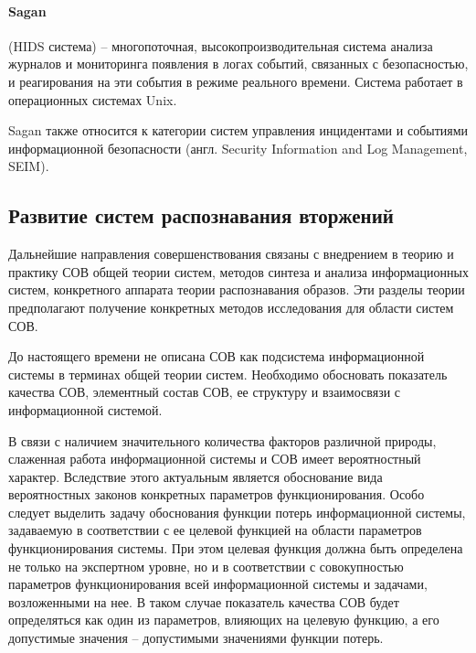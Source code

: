\paragraph*{Sagan} (HIDS система) -- многопоточная, высокопроизводительная система анализа журналов и мониторинга 
появления в логах событий, связанных с безопасностью, и реагирования на эти события в режиме реального времени. 
Система работает в операционных системах Unix. 

Sagan также относится к категории систем управления инцидентами и событиями информационной безопасности 
(англ. Security Information and Log Management, SEIM).


\subsection{Развитие систем распознавания вторжений}


Дальнейшие направления совершенствования связаны с внедрением в теорию и практику СОВ общей теории систем, методов синтеза и анализа информационных систем, конкретного аппарата теории распознавания образов. Эти разделы теории предполагают получение конкретных методов исследования для области систем СОВ.

До настоящего времени не описана СОВ как подсистема информационной системы в терминах общей теории систем. Необходимо обосновать показатель качества СОВ, элементный состав СОВ, ее структуру и взаимосвязи с информационной системой.

В связи с наличием значительного количества факторов различной природы, слаженная работа информационной системы и СОВ имеет вероятностный характер. Вследствие этого актуальным является обоснование вида вероятностных законов конкретных параметров функционирования. Особо следует выделить задачу обоснования функции потерь информационной системы, задаваемую в соответствии с ее целевой функцией на области параметров функционирования системы. При этом целевая функция должна быть определена не только на экспертном уровне, но и в соответствии с совокупностью параметров функционирования всей информационной системы и задачами, возложенными на нее. В таком случае показатель качества СОВ будет определяться как один из параметров, влияющих на целевую функцию, а его допустимые значения -- допустимыми значениями функции потерь.

